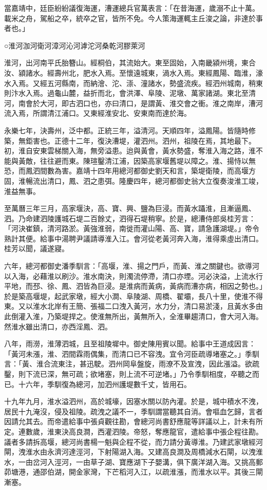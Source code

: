 當嘉靖中，廷臣紛紛議復海運，漕運總兵官萬表言：「在昔海運，歲溺不止十萬。載米之舟，駕船之卒，統卒之官，皆所不免。今人策海運輒主丘浚之論，非達於事者也。」

○淮河泇河衛河漳河沁河滹沱河桑乾河膠萊河

淮河，出河南平氏胎簪山。經桐伯，其流始大。東至固始，入南畿潁州境，東合汝、潁諸水。經壽州北，肥水入焉。至懷遠城東，渦水入焉。東經鳳陽、臨淮，濠水入焉。又經五河縣南，而納澮、沱、漴、潼諸水，勢盛流疾。經泗州城南，稍東則汴水入焉。過龜山麓，益折而北，會洪澤、阜陵、泥墩、萬家諸湖。東北至清河，南會於大河，即古泗口也，亦曰清口，是謂黃、淮交會之衝。淮之南岸，漕河流入焉，所謂清江浦口。又東經淮安北、安東南而達於海。

永樂七年，決壽州，泛中都。正統三年，溢清河。天順四年，溢鳳陽。皆隨時修築，無鉅害也。正德十二年，復決漕堤，灌泗州。泗州，祖陵在焉，其地最下。初，淮自安東雲梯關入海，無旁溢患。迨與黃會，黃水勢盛，奪淮入海之路，淮不能與黃敵，往往避而東。陳瑄鑿清江浦，因築高家堰舊堤以障之。淮、揚恃以無恐，而鳳泗間數為害。嘉靖十四年用總河都御史劉天和言，築堤衛陵，而高堰方固，淮暢流出清口，鳳、泗之患弭。隆慶四年，總河都御史翁大立復奏浚淮工竣，淮益無事。

至萬曆三年三月，高家堰決，高、寶、興、鹽為巨浸。而黃水躡淮，且漸逼鳳、泗。乃命建泗陵護城石堤二百餘丈，泗得石堤稍寧。於是，總漕侍郎吳桂芳言：「河決崔鎮，清河路淤。黃強淮弱，南徙而灌山陽、高、寶，請急護湖堤。」帝令熟計其便。給事中湯聘尹議請導淮入江。會河從老黃河奔入海，淮得乘虛出清口。桂芳以聞，議遂寢。

六年，總河都御史潘季馴言：「高堰，淮、揚之門戶，而黃、淮之關鍵也。欲導河以入海，必藉淮以刷沙。淮水南決，則濁流停滯，清口亦堙。河必決溢，上流水行平地，而邳、徐、鳳、泗皆為巨浸。是淮病而黃病，黃病而漕亦病，相因之勢也。」於是築高堰堤，起武家墩，經大小澗、阜陵湖、周橋、翟壩，長八十里，使淮不得東。又以淮水北岸有王簡、張福二口洩入黃河，水力分，清口易淤淺，且黃水多由此倒灌入淮，乃築堤捍之。使淮無所出，黃無所入，全淮畢趨清口，會大河入海。然淮水雖出清口，亦西淫鳳、泗。

八年，雨澇，淮薄泗城，且至祖陵墀中。御史陳用賓以聞。給事中王道成因言：「黃河未漲，淮、泗間霖雨偶集，而清口已不容洩。宜令河臣疏導堵塞之。」季馴言：「黃、淮合流東注，甚迅駛。泗州岡阜盤旋，雨潦不及宣洩，因此漲溢。欲疏鑿，則下流已深，無可疏；欲堵塞，則上流不可逆堵。」乃令季馴相度，卒聽之而已。十六年，季馴復為總河，加泗州護堤數千丈，皆用石。

十九年九月，淮水溢泗州，高於城壕，因塞水關以防內灌。於是，城中積水不洩，居民十九淹沒，侵及祖陵。疏洩之議不一，季馴謂當聽其自消。會嘔血乞歸，言者因請允其去。而帝遣給事中張貞觀往勘，會總河尚書舒應龍等詳議以上，計未有所定。連數歲，淮東決高良澗，西灌泗陵。帝怒，奪應龍官，遣給事中張企程往勘。議者多請拆高堰，總河尚書楊一魁與企程不從，而力請分黃導淮。乃建武家墩經河閘，洩淮水由永濟河達涇河，下射陽湖入海。又建高良澗及周橋減水石閘，以洩淮水，一由岔河入涇河，一由草子湖、寶應湖下子嬰溝，俱下廣洋湖入海。又挑高郵茆塘港，通邵伯湖，開金家灣，下芒稻河入江，以疏淮漲，而淮水以平。其後三閘漸塞。

